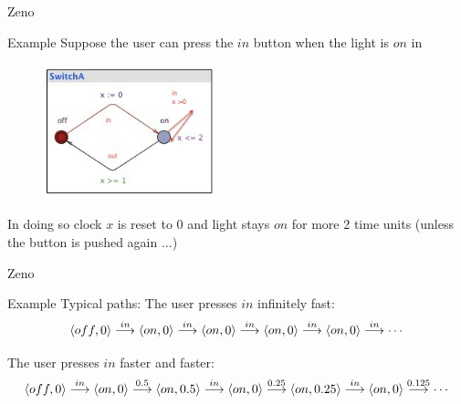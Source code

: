 \documentclass{beamer}
\def\dgold#1{{\darkgoldenrod #1}}
\begin{document}
\begin{slide}{Zeno}
\small


\begin{block}{Example}
Suppose the user can press the $in$ button when the light is $on$ in
\begin{figure}[htb]
  \centering
  \includegraphics[width=5cm]{./images/PASswitchD.jpg}\\
\end{figure}
In doing so clock $x$ is reset to 0 and light stays $on$ for more 2 time units (unless the button is pushed again ...)
\end{block}

\end{slide}

\begin{slide}{Zeno}
\small


\begin{block}{Example}
\dgold{Typical paths:}
The user presses $in$ \dgold{infinitely fast}:
\begin{equation*}
\pair{off,0}  \tran{in}  \pair{on,0}  \tran{in}  \pair{on,0}  \tran{in}  \pair{on,0}  \tran{in}  \pair{on,0}  \tran{in} \cdots
\end{equation*}


The user presses $in$ \dgold{faster and faster}:
\begin{equation*}
\pair{off,0}  \tran{in}   \pair{on,0}  \tran{0.5} \pair{on,0.5} \tran{in} \pair{on,0} \tran{0.25}  \pair{on,0.25}   \tran{in} \pair{on,0}  \tran{0.125}  \cdots
\end{equation*}
\end{block}



\end{slide}
\end{document}
